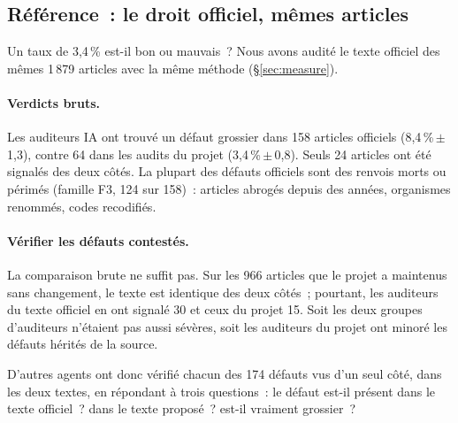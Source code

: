 \documentclass[11pt,a4paper]{article}
\begin{document}
\subsection{Référence~: le droit officiel, mêmes articles}
\label{sec:baseline}

Un taux de 3,4\,\% est-il bon ou mauvais~? Nous avons audité le texte officiel des mêmes 1\,879 articles avec la même méthode (\S\ref{sec:measure}).

\paragraph{Verdicts bruts.}
Les auditeurs IA ont trouvé un défaut grossier dans 158 articles officiels (8,4\,\%\,$\pm$\,1,3), contre 64 dans les audits du projet (3,4\,\%\,$\pm$\,0,8). Seuls 24 articles ont été signalés des deux côtés. La plupart des défauts officiels sont des renvois morts ou périmés (famille F3, 124 sur 158)~: articles abrogés depuis des années, organismes renommés, codes recodifiés.

\paragraph{Vérifier les défauts contestés.}
La comparaison brute ne suffit pas. Sur les 966 articles que le projet a maintenus sans changement, le texte est identique des deux côtés~; pourtant, les auditeurs du texte officiel en ont signalé 30 et ceux du projet 15. Soit les deux groupes d'auditeurs n'étaient pas aussi sévères, soit les auditeurs du projet ont minoré les défauts hérités de la source.

D'autres agents ont donc vérifié chacun des 174 défauts vus d'un seul côté, dans les deux textes, en répondant à trois questions~: le défaut est-il présent dans le texte officiel~? dans le texte proposé~? est-il vraiment grossier~?
\end{document}
